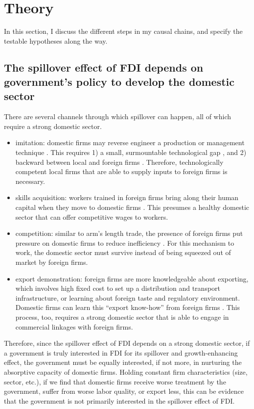 \documentclass[12pt]{article}
\begin{document}
\section{Theory}

In this section, I discuss the different steps in my causal chains, and specify the testable hypotheses along the way.

\subsection{The spillover effect of FDI depends on government's policy to develop the domestic sector}

There are several channels through which spillover can happen, all of which require a strong domestic sector.
\begin{itemize}
	\item imitation:  domestic firms may reverse engineer a production or management technique \citep{Wang1992}. This requires 1) a small, surmountable technological gap \citep{Kokko1996}, and 2) backward between local and foreign firms \citep{Javorcik2004}. Therefore, technologically competent local firms that are able to supply inputs to foreign firms is necessary.
	\item skills acquisition: workers trained in foreign firms bring along their human capital when they move to domestic firms \citep{Djankov2000}. This presumes a healthy domestic sector that can offer competitive wages to workers. 
	\item competition: similar to arm's length trade, the presence of foreign firms put pressure on domestic firms to reduce inefficiency \citep{Glass2002}. For this mechanism to work, the domestic sector must survive instead of being squeezed out of market by foreign firms.
	\item export demonstration: foreign firms are more knowledgeable about exporting, which involves high fixed cost to set up a distribution and transport infrastructure, or learning about foreign taste and regulatory environment. Domestic firms can learn this ``export know-how'' from foreign firms \citep{Aitken1997}. This process, too, requires a strong domestic sector that is able to engage in commercial linkages with foreign firms.
\end{itemize}

Therefore, since the spillover effect of FDI depends on a strong domestic sector, if a government is truly interested in FDI for its spillover and growth-enhancing effect, the government must be equally interested, if not more, in nurturing the absorptive capacity of domestic firms. Holding constant firm characteristics (size, sector, etc.), if we find that domestic firms receive worse treatment by the government, suffer from worse labor quality, or export less, this can be evidence that the government is not primarily interested in the spillover effect of FDI.
\end{document}
